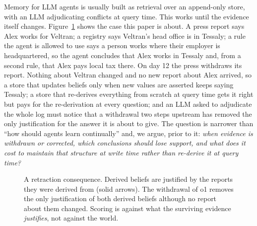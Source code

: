 Memory for LLM agents is usually built as retrieval over an append-only store, with an LLM adjudicating conflicts at query time. This works until the evidence itself changes. Figure~\ref{fig:example} shows the case this paper is about. A press report says Alex works for Veltran; a registry says Veltran's head office is in Tessaly; a rule the agent is allowed to use says a person works where their employer is headquartered, so the agent concludes that Alex works in Tessaly and, from a second rule, that Alex pays local tax there. On day 12 the press withdraws its report. Nothing about Veltran changed and no new report about Alex arrived, so a store that updates beliefs only when new values are asserted keeps saying Tessaly; a store that re-derives everything from scratch at query time gets it right but pays for the re-derivation at every question; and an LLM asked to adjudicate the whole log must notice that a withdrawal two steps upstream has removed the only justification for the answer it is about to give. The question is narrower than ``how should agents learn continually'' and, we argue, prior to it: \emph{when evidence is withdrawn or corrected, which conclusions should lose support, and what does it cost to maintain that structure at write time rather than re-derive it at query time?}

\begin{figure}[t]\centering
{}
\caption{A retraction consequence. Derived beliefs are justified by the reports they were derived from (solid arrows). The withdrawal of o1 removes the only justification of both derived beliefs although no report about them changed. Scoring is against what the surviving evidence \emph{justifies}, not against the world.}\label{fig:example}
\end{figure}

